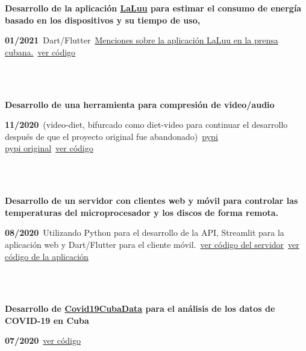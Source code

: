 \documentclass{article}
\begin{document}
    \begin{minipage}{0.8\textwidth}
    \parbox{0.8\linewidth}{\textbf{Desarrollo de la aplicación \hyperref[sec:laluu]{LaLuu} para estimar el consumo de energía basado en los dispositivos y su tiempo de uso,}} \hfill \textbf{01/2021}\
    Dart/Flutter\
    \hyperref[sec:laluu_press]{Menciones sobre la aplicación LaLuu en la prensa cubana.}\
    \href{https://github.com/geeksLabTech/LaLuu}{ver código}\
    \end{minipage} \hfill {}\\\\
    \begin{minipage}{0.8\textwidth}
    \parbox{0.8\linewidth}{\textbf{Desarrollo de una herramienta para compresión de video/audio}} \hfill \textbf{11/2020}\
    (video-diet, bifurcado como diet-video para continuar el desarrollo después de que el proyecto original fue abandonado)\
    \href{https://pypi.org/project/diet-video/}{pypi}\\
    \href{https://pypi.org/project/video-diet/}{pypi original}\
    \href{https://github.com/JavierOramas/video-diet}{ver código}\
    \end{minipage} \hfill {}\\\\
    \begin{minipage}{0.8\textwidth}
    \parbox{0.8\linewidth}{\textbf{Desarrollo de un servidor con clientes web y móvil para controlar las temperaturas del microprocesador y los discos de forma remota.}} \hfill \textbf{08/2020}\
    Utilizando Python para el desarrollo de la API, Streamlit para la aplicación web y Dart/Flutter para el cliente móvil.\
    \href{https://github.com/JavierOramas/temperatureMonitor}{ver código del servidor}\
    \href{https://github.com/JavierOramas/temperatureMonitor-app}{ver código de la aplicación}\
    \end{minipage} \hfill {}\\\\
    \begin{minipage}{0.8\textwidth}
    \parbox{0.8\linewidth}{\textbf{Desarrollo de \hyperref[sec:covid]{Covid19CubaData} para el análisis de los datos de COVID-19 en Cuba}} \hfill \textbf{07/2020}\
    \href{https://github.com/covid19cuba/covid19cuba-action}{ver código}\
    \end{minipage} \hfill {}\\\\
\end{document}
